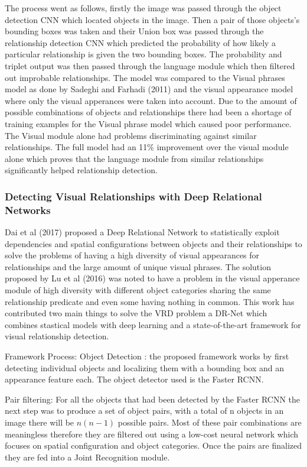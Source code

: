 \documentclass{csfyp}
\begin{document}
The process went as follows, firstly the image was passed through the object detection CNN which located objects in the image. Then a pair of those objects’s bounding boxes was taken and their Union box was passed through the relationship detection CNN which predicted the probability of how likely a particular relationship is given the two bounding boxes. The probability and triplet output was then passed through the language module which then filtered out improbable relationships. The model was compared to the Visual phrases model as done  by Sadeghi and Farhadi (2011) and the visual appearance model where only the visual apperances were taken into account. Due to the amount of possible combinations of objects and relationships there had been a shortage of training examples for the Visual phrase model which caused poor performance. The Visual module alone had problems discriminating against similar relationships. The full model had an 11\% improvement over the visual module alone which proves that the language module from similar relationships significantly helped relationship detection. 

\subsubsection{Detecting Visual Relationships with Deep Relational Networks}
Dai et al (2017) proposed a Deep Relational Network to statistically exploit dependencies and spatial configurations between objects and their relationships to solve the problems of having a high diversity of visual appearances for relationships and the large amount of unique visual phrases. The solution proposed by Lu et al (2016) was noted to have a problem in the visual apperance module of high diversity with different object categories sharing the same relationship predicate and even some having nothing in common. This work has contributed two main things to solve the VRD problem a DR-Net which combines stastical models with deep learning and a state-of-the-art framework for visual relationship detection. 

Framework Process:
Object Detection : the proposed framework works by first detecting individual objects and localizing them with a bounding box and an appearance feature each. The object detector used is the Faster RCNN.

Pair filtering:
For all the objects that had been detected by the Faster RCNN the next step was to produce a set of object pairs, with a total of n objects in an image there will be $n(n-1)$ possible pairs. Most of these pair combinations are meaningless therefore they are filtered out using a low-cost neural network which focuses on spatial configuration and object categories. Once the pairs are finalized they are fed into a Joint Recognition module.
\end{document}
